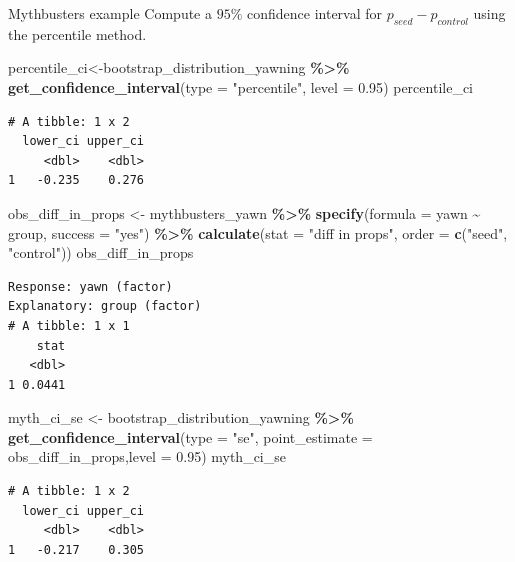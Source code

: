 \documentclass[
  ignorenonframetext,
]{beamer}
\newenvironment{Shaded}{\begin{snugshade}}{\end{snugshade}}
\newcommand{\AttributeTok}[1]{\textcolor[rgb]{0.13,0.29,0.53}{#1}}
\newcommand{\FloatTok}[1]{\textcolor[rgb]{0.00,0.00,0.81}{#1}}
\newcommand{\FunctionTok}[1]{\textcolor[rgb]{0.13,0.29,0.53}{\textbf{#1}}}
\newcommand{\NormalTok}[1]{#1}
\newcommand{\OtherTok}[1]{\textcolor[rgb]{0.56,0.35,0.01}{#1}}
\newcommand{\SpecialCharTok}[1]{\textcolor[rgb]{0.81,0.36,0.00}{\textbf{#1}}}
\newcommand{\StringTok}[1]{\textcolor[rgb]{0.31,0.60,0.02}{#1}}
\begin{document}
\begin{frame}[fragile]{Mythbusters example}
\protect\hypertarget{mythbusters-example-3}{}
Compute a \(95\%\) confidence interval for \(p_{seed}-p_{control}\)
using the percentile method.

\tiny

\begin{Shaded}
\begin{Highlighting}[]
\NormalTok{percentile\_ci}\OtherTok{\textless{}{-}}\NormalTok{bootstrap\_distribution\_yawning }\SpecialCharTok{\%\textgreater{}\%} 
  \FunctionTok{get\_confidence\_interval}\NormalTok{(}\AttributeTok{type =} \StringTok{"percentile"}\NormalTok{, }\AttributeTok{level =} \FloatTok{0.95}\NormalTok{)}
\NormalTok{percentile\_ci}
\end{Highlighting}
\end{Shaded}

\begin{verbatim}
# A tibble: 1 x 2
  lower_ci upper_ci
     <dbl>    <dbl>
1   -0.235    0.276
\end{verbatim}

\begin{Shaded}
\begin{Highlighting}[]
\NormalTok{obs\_diff\_in\_props }\OtherTok{\textless{}{-}}\NormalTok{ mythbusters\_yawn }\SpecialCharTok{\%\textgreater{}\%} 
  \FunctionTok{specify}\NormalTok{(}\AttributeTok{formula =}\NormalTok{ yawn }\SpecialCharTok{\textasciitilde{}}\NormalTok{ group, }\AttributeTok{success =} \StringTok{"yes"}\NormalTok{) }\SpecialCharTok{\%\textgreater{}\%} 
  \FunctionTok{calculate}\NormalTok{(}\AttributeTok{stat =} \StringTok{"diff in props"}\NormalTok{, }\AttributeTok{order =} \FunctionTok{c}\NormalTok{(}\StringTok{"seed"}\NormalTok{, }\StringTok{"control"}\NormalTok{))}
\NormalTok{obs\_diff\_in\_props}
\end{Highlighting}
\end{Shaded}

\begin{verbatim}
Response: yawn (factor)
Explanatory: group (factor)
# A tibble: 1 x 1
    stat
   <dbl>
1 0.0441
\end{verbatim}

\begin{Shaded}
\begin{Highlighting}[]
\NormalTok{myth\_ci\_se }\OtherTok{\textless{}{-}}\NormalTok{ bootstrap\_distribution\_yawning }\SpecialCharTok{\%\textgreater{}\%} 
  \FunctionTok{get\_confidence\_interval}\NormalTok{(}\AttributeTok{type =} \StringTok{"se"}\NormalTok{, }\AttributeTok{point\_estimate =}\NormalTok{ obs\_diff\_in\_props,}\AttributeTok{level =} \FloatTok{0.95}\NormalTok{)}
\NormalTok{myth\_ci\_se}
\end{Highlighting}
\end{Shaded}

\begin{verbatim}
# A tibble: 1 x 2
  lower_ci upper_ci
     <dbl>    <dbl>
1   -0.217    0.305
\end{verbatim}

\normalsize
\end{frame}
\end{document}
